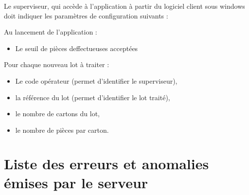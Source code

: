 Le superviseur, qui accède à l'application à partir du logiciel client sous
windows doit indiquer les paramètres de configuration suivants :

Au lancement de l'application :\\
\begin{itemize}
	\item Le seuil de pièces deffectueuses acceptées
\end{itemize}

Pour chaque nouveau lot à traiter :\\
\begin{itemize}
	\item Le code opérateur (permet d'identifier le superviseur),
	\item la référence du lot (permet d'identifier le lot traité),
	\item le nombre de cartons du lot,
	\item le nombre de pièces par carton.
\end{itemize}

\section{Liste des erreurs et anomalies émises par le serveur}

